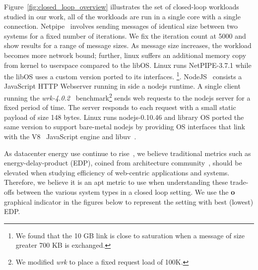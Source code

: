 Figure~\ref{fig:closed_loop_overview} illustrates the set of closed-loop workloads studied in our work, all of the workloads are run in a single core with a single connection. Netpipe~\cite{snell1996netpipe} involves sending messages of identical size between two systems for a fixed number of iterations. We fix the iteration count at 5000 and show results for a range of message sizes. As message size increases, the workload becomes more network bound; further, linux suffers an additional memory copy from kernel to userspace compared to the libOS. Linux runs NetPIPE-3.7.1 while the libOS uses a custom version ported to its interfaces. \footnote{We found that the 10 GB link is close to saturation when a message of size greater 700 KB is exchanged.}. NodeJS~\cite{nodejs} consists a JavaScript HTTP Webserver running in side a nodejs runtime. A single client running the \textit{wrk-4.0.2}~\cite{wrk} benchmark\footnote{We modified \textit{wrk} to place a fixed request load of 100K.} sends web requests to the nodejs server for a fixed period of time. The server responds to each request with a small static payload of size 148 bytes. Linux runs nodejs-0.10.46 and library OS ported the same version to support bare-metal nodejs by providing OS interfaces that link with the V8~\cite{v8} JavaScript engine and libuv~\cite{libuv}. 

As datacenter energy use continue to rise~\cite{gupta2020chasing, NLP-energy,warehouse-power}, we believe traditional metrics such as energy-delay-product (EDP), coined from architecture community~\cite{573184,10.1109/40.888701}, should be elevated when studying efficiency of web-centric applications and systems. Therefore, we believe it is an apt metric to use when understanding these trade-offs between the various system types in a closed loop setting. We use the {\larger[4]\textbf{o}} graphical indicator in the figures below to represent the setting with best (lowest) EDP.



